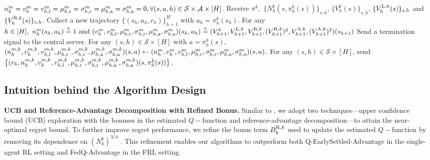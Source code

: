 \documentclass{article}
\newcommand{\LL}{\textnormal{L}}
\newcommand{\R}{\textnormal{R}}
\newcommand{\nr}{\textnormal{r}}
\newcommand{\A}{\textnormal{A}}
\newcommand{\na}{\textnormal{a}}
\begin{document}
\vspace{-0.3cm}
\begin{algorithm}[ht]
    \caption{FedQ-EarlySettled-LowCost (Agent $m$ in Round $k$)}
    \label{alg_early_agent}
    \begin{algorithmic}[1]
     $n_h^{m}= v_h^m= v_{h,l}^m=\mu_{h,\nr}^{m}= \sigma_{h,\nr}^{m}= \mu_{h,\na}^{m}=\sigma_{h,\na}^{m} =0,\forall (s,a,h)\in \mathcal{S} \times \mathcal {A} \times [H]$.
    \STATE Receive $\pi^k,$ $\{N_h^k(s,\pi_{h}^k(s))\}_{s,h}$, $\{V_h^k(s)\}_{s,h}$, $\{V_h^{\LL,k}(s)\}_{s,h}$ and $\{V_h^{\R,k}(s)\}_{s,h}$.
    \STATE Collect a new trajectory $\{(s_h,a_h,r_h)\}_{h=1}^H$ with $a_h = \pi_h^k(s_h)$.
    \STATE For any $ h \in [H],\ n_h^{m}(s_h,a_h)\overset{+}{=} 1\text{ and } 
(v_h^m, v_{h,l}^m, \mu_{h,\nr}^{m} ,\sigma_{h,\nr}^{m}, \mu_{h,\na}^{m},\sigma_{h,\na}^{m})(s_h,a_h)
\overset{+}{=} ( V_{h+1}^k,V_{h+1}^{\LL,k},V_{h+1}^{\R,k},(V_{h+1}^{\R,k})^2, V_{h+1}^{\A,k}, (V_{h+1}^{\A,k})^2)(s_{h+1})$
    \ENDWHILE
    \STATE Send a termination signal to the central server.
    \ENDWHILE
    \STATE For any $(s,h) \in \mathcal{S} \times [H]$ with $a = \pi_h^k(s)$,\\
    $(n_h^{m,k},v_h^{m,k},v_{h,l}^{m,k}, \mu_{h,\nr}^{m,k}, \sigma_{h,\nr}^{m,k}, \mu_{h,\na}^{m,k}, \sigma_{h,\na}^{m,k})(s,a) \leftarrow (n_h^{m}, v_h^m,v_{h,l}^m, \mu_{h,\nr}^{m}, \sigma_{h,\nr}^{m}, \mu_{h,\na}^{m},\sigma_{h,\na}^{m})(s,a).$
    \STATE For any $(s,h) \in \mathcal{S} \times [H]$, send $\big\{(r_h, n_h^{m,k}, v_{h}^{m,k}, v_{h,l}^{m,k}, \mu_{h,\nr}^{m,k}, \sigma_{h,\nr}^{m,k}, \mu_{h,\na}^{m,k}, \sigma_{h,\na}^{m,k})(s,\pi_h^k(s))\big\}$.
\end{algorithmic}
\end{algorithm}
\subsection{Intuition behind the Algorithm Design}
\textbf{UCB and Reference-Advantage Decomposition with Refined Bonus.} 
Similar to \cite{li2023breaking,zheng2024federated}, we adopt two techniques—upper confidence bound (UCB) exploration with the bonuses in the estimated $Q-$function and reference-advantage decomposition—to attain the near-optimal regret bound. To further improve regret performance, we refine the bonus term $B_h^{\R,k}$ used to update the estimated $Q-$function by removing its dependence on $(N_h^k)^{3/4}$ \citep{li2023breaking,zheng2024federated}. This refinement enables our algorithms to outperform both Q-EarlySettled-Advantage in the single-agent RL setting and FedQ-Advantage in the FRL setting.
\end{document}
